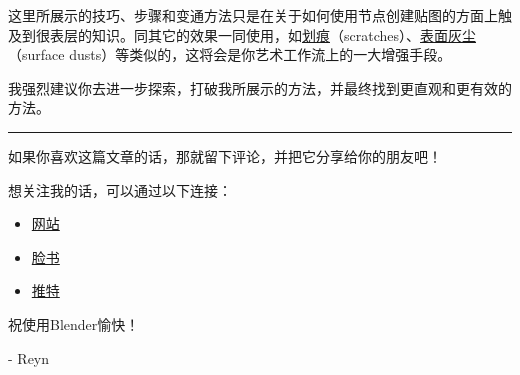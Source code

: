\documentclass[11pt,a4paper,UTF8]{ctexart}
\begin{document}

这里所展示的技巧、步骤和变通方法只是在关于如何使用节点创建贴图的方面上触及到很表层的知识。同其它的效果一同使用，如\underline{划痕}（scratches）、\underline{表面灰尘}（surface dusts）等类似的，这将会是你艺术工作流上的一大增强手段。

我强烈建议你去进一步探索，打破我所展示的方法，并最终找到更直观和更有效的方法。

\noindent \rule[4pt]{500pt}{.5pt}

如果你喜欢这篇文章的话，那就留下评论，并把它分享给你的朋友吧！

想关注我的话，可以通过以下连接：
\begin{itemize}
    \item \href{http://www.reynantemartinez.com/}{网站}
    \item \href{https://www.facebook.com/artofreynantemartinez}{脸书}
    \item \href{https://twitter.com/reynantem}{推特}
\end{itemize}

祝使用Blender愉快！

- Reyn
\end{document}
